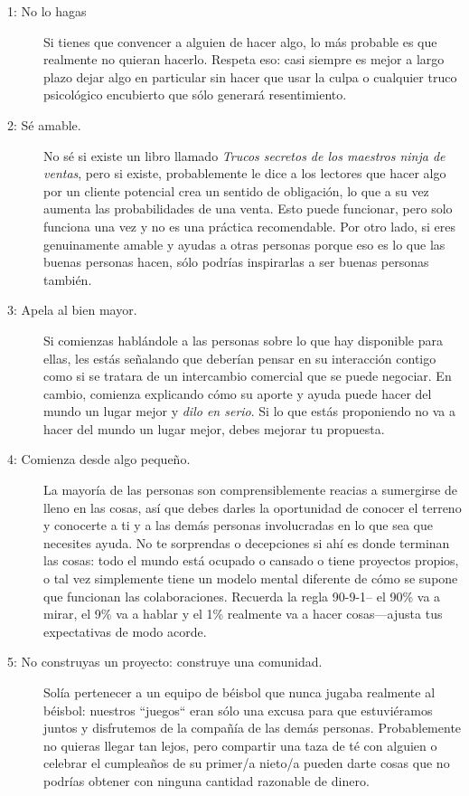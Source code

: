 \begin{description}
\item[1: No lo hagas]

Si tienes que convencer a alguien de hacer algo,
lo más probable es que realmente no quieran hacerlo.
Respeta eso:
casi siempre es mejor a largo plazo dejar algo en particular sin hacer 
que usar la culpa o cualquier truco psicológico encubierto que sólo generará resentimiento.


\item[2: Sé amable.]
No sé si existe un libro llamado
 \emph{Trucos secretos de los maestros ninja de ventas},
pero si existe,
probablemente le dice a los lectores que hacer algo por un cliente potencial 
crea un sentido de obligación,
lo que a su vez aumenta las probabilidades de una venta.
Esto puede funcionar, pero solo funciona una vez y no es una práctica recomendable.
Por otro lado,
si eres genuinamente amable
y ayudas a otras personas porque eso es lo que las buenas personas hacen,
sólo podrías inspirarlas a ser buenas personas también.

\item[3: Apela al bien mayor.]
Si comienzas hablándole a las personas sobre lo que hay disponible para ellas,
les estás señalando que deberían pensar en su interacción contigo
como si se tratara de  un intercambio comercial que se puede negociar.
En cambio,
comienza explicando cómo su aporte y ayuda puede hacer del mundo un lugar mejor 
y \emph{dilo en serio}.
Si lo que estás proponiendo no va a hacer del mundo un lugar mejor,
debes mejorar tu propuesta.


\item[4: Comienza desde algo pequeño.]
La mayoría de las personas son comprensiblemente reacias a sumergirse de lleno en las cosas, 
así que debes darles  la oportunidad de conocer el terreno 
y conocerte a ti y a las demás personas involucradas
 en lo que sea que necesites ayuda.
No te sorprendas o decepciones si ahí es donde terminan las cosas:
todo el mundo está ocupado o cansado o tiene proyectos propios,
o tal vez simplemente tiene un modelo mental diferente de cómo se supone que funcionan las colaboraciones.
Recuerda la regla  90-9-1-- el 90\% va a mirar, el 9\% va a hablar y el 1\% 
realmente va a hacer cosas---ajusta tus expectativas de modo acorde.

\item[5: No construyas un proyecto: construye una comunidad.]
Solía pertenecer a un equipo de béisbol que nunca jugaba realmente al béisbol:
nuestros ``juegos`` eran sólo una excusa para que estuviéramos juntos y disfrutemos de la compañía de las demás personas.
Probablemente no quieras llegar tan lejos,
pero compartir una taza de té con alguien o celebrar el cumpleaños de su primer/a nieto/a
pueden darte cosas que no podrías obtener con ninguna cantidad razonable de dinero.


\end{description}
